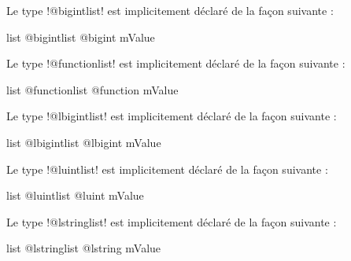 
Le type \ggs!@bigintlist! est implicitement déclaré de la façon suivante :

\begin{galgasbox}
list @bigintlist {
  @bigint mValue
}
\end{galgasbox}









Le type \ggs!@functionlist! est implicitement déclaré de la façon suivante :

\begin{galgasbox}
list @functionlist {
  @function mValue
}
\end{galgasbox}









Le type \ggs!@lbigintlist! est implicitement déclaré de la façon suivante :

\begin{galgasbox}
list @lbigintlist {
  @lbigint mValue
}
\end{galgasbox}











Le type \ggs!@luintlist! est implicitement déclaré de la façon suivante :

\begin{galgasbox}
list @luintlist {
  @luint mValue
}
\end{galgasbox}











Le type \ggs!@lstringlist! est implicitement déclaré de la façon suivante :

\begin{galgasbox}
list @lstringlist {
  @lstring mValue
}
\end{galgasbox}







